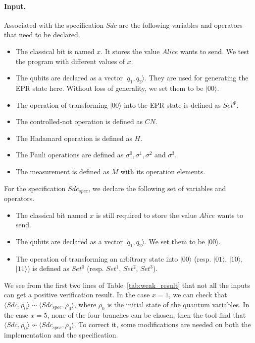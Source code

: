 \documentclass[a4paper,runningheads]{llncs}
\begin{document}
\paragraph{Input.}
Associated with the specification $Sdc$ are the following variables and operators that need to be declared.
\begin{itemize}
    \item The classical bit is named $x$. It stores the value $Alice$ wants to send. We test the program with different values of $x$.
    \item The qubits are declared as a vector $|q_1,q_2\rangle$. They are used for generating the EPR state here. Without loss of generality, we set them to be $|00\rangle$.
    \item The operation of transforming $|00\rangle$ into the EPR state is defined as $Set^{\Psi}$. 
    \item The controlled-not operation is defined as $CN$.
    \item The Hadamard operation is defined as $H$.
    \item The Pauli operations are defined as $\sigma^0,\sigma^1,\sigma^2$ and $\sigma^3$.
    \item The measurement is defined as $M$ with its operation elements.
\end{itemize}

For the specification $Sdc_{spec}$, we declare the following set of variables and operators.
\begin{itemize}
    \item The classical bit named $x$ is still required to store the value $Alice$ wants to send.
    \item The qubits are declared as a vector $|q_1,q_2\rangle$. We set them to be $|00\rangle$.
    \item The operation of transforming an arbitrary state into $|00\rangle$ (resp. $|01\rangle$, $|10\rangle$, $|11\rangle$) is defined as $Set^{0}$ (resp. $Set^{1}$, $Set^{2}$, $Set^{3}$).
\end{itemize}

We see from the first two lines of Table~\ref{tab:weak_result} that not all the inputs can get a positive verification result. In the case $x=1$, we can check that $\langle Sdc,\rho_0\rangle \sim \langle Sdc_{spec},\rho_0\rangle$, where $\rho_0$ is the initial state of the quantum variables. In the case $x=5$,  none of the four branches can be chosen, then the tool find that  $\langle Sdc,\rho_0\rangle \not\sim \langle Sdc_{spec},\rho_0\rangle$. To correct it, some modifications are needed on both the implementation and the specification.
\end{document}
